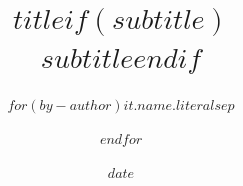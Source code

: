 \title{$title$$if(subtitle)$\\\large $subtitle$$endif$}
\author{$for(by-author)$$it.name.literal$$sep$ \and $endfor$}
\date{$date$}
